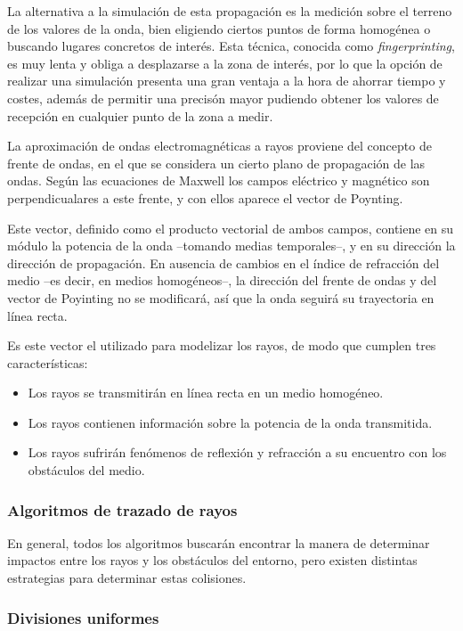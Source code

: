 La alternativa a la simulación de esta propagación es la medición sobre el terreno de los valores de la onda, bien eligiendo ciertos puntos de forma homogénea o buscando lugares concretos de interés.
Esta técnica, conocida como \textit{fingerprinting}, es muy lenta y obliga a desplazarse a la zona de interés, por lo que la opción de realizar una simulación presenta una gran ventaja a la hora de ahorrar tiempo y costes, además de permitir una precisón mayor pudiendo obtener los valores de recepción en cualquier punto de la zona a medir.\cite{People}

La aproximación de ondas electromagnéticas a rayos proviene del concepto de frente de ondas, en el que se considera un cierto plano de propagación de las ondas.
Según las ecuaciones de Maxwell los campos eléctrico y magnético son perpendicualares a este frente, y con ellos aparece el vector de Poynting.\cite{Compilation}

Este vector, definido como el producto vectorial de ambos campos, contiene en su módulo la potencia de la onda --tomando medias temporales--, y en su dirección la dirección de propagación.
En ausencia de cambios en el índice de refracción del medio --es decir, en medios homogéneos--, la dirección del frente de ondas y del vector de Poyinting no se modificará, así que la onda seguirá su trayectoria en línea recta.

Es este vector el utilizado para modelizar los rayos, de modo que cumplen tres características:
\begin{itemize}
    \item Los rayos se transmitirán en línea recta en un medio homogéneo.
    \item Los rayos contienen información sobre la potencia de la onda transmitida.
    \item Los rayos sufrirán fenómenos de reflexión y refracción a su encuentro con los obstáculos del medio.
\end{itemize}

\subsubsection{Algoritmos de trazado de rayos}

En general, todos los algoritmos buscarán encontrar la manera de determinar impactos entre los rayos y los obstáculos del entorno, pero existen distintas estrategias para determinar estas colisiones.

\subsubsection*{Divisiones uniformes}

